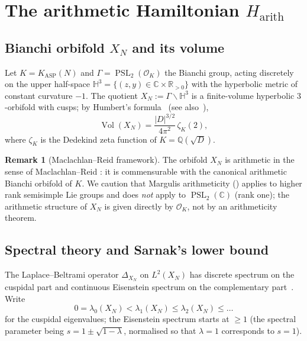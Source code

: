 \documentclass[11pt,a4paper]{article}
\theoremstyle{definition}
\newtheorem{remark}[theorem]{Remark}
\DeclareMathOperator{\Vol}{Vol}
\DeclareMathOperator{\PSL}{PSL}
\newcommand{\KASP}{K_{\mathrm{ASP}}}
\newcommand{\Harith}{H_{\mathrm{arith}}}
\newcommand{\HH}{\mathbb{H}}
\newcommand{\QQ}{\mathbb{Q}}
\newcommand{\RR}{\mathbb{R}}
\newcommand{\CC}{\mathbb{C}}
\newcommand{\OK}{\mathcal{O}_K}
\begin{document}
\section{The arithmetic Hamiltonian $\Harith$}\label{sec:Harith}

\subsection{Bianchi orbifold $X_N$ and its volume}

Let $K = \KASP(N)$ and $\Gamma = \PSL_2(\OK)$ the Bianchi group, acting
discretely on the upper half-space $\HH^3 = \{(z, y) \in \CC\times\RR_{>0}\}$
with the hyperbolic metric of constant curvature $-1$. The quotient
$X_N := \Gamma\backslash\HH^3$ is a finite-volume hyperbolic
$3$-orbifold with cusps; by Humbert's formula~\cite{Humbert1919}
(see also~\cite[\S 9.6]{EGM1998}),
\begin{equation}\label{eq:humbert}
  \Vol(X_N) = \frac{|D|^{3/2}}{4\pi^2}\,\zeta_K(2),
\end{equation}
where $\zeta_K$ is the Dedekind zeta function of $K = \QQ(\sqrt{D})$.

\begin{remark}[Maclachlan--Reid framework]
The orbifold $X_N$ is arithmetic in the sense of Maclachlan--Reid
\cite[Ch.~8]{MaclachlanReid2003}: it is commensurable with the canonical
arithmetic Bianchi orbifold of $K$. We caution that Margulis arithmeticity
(\cite{Margulis1991}) applies to higher rank semisimple Lie groups and
does \emph{not} apply to $\PSL_2(\CC)$ (rank one); the arithmetic structure
of $X_N$ is given directly by $\OK$, not by an arithmeticity theorem.
\end{remark}

\subsection{Spectral theory and Sarnak's lower bound}

The Laplace--Beltrami operator $\Delta_{X_N}$ on $L^2(X_N)$ has discrete
spectrum on the cuspidal part and continuous Eisenstein spectrum on the
complementary part~\cite[Ch.~6]{EGM1998}. Write
\[
  0 = \lambda_0(X_N) < \lambda_1(X_N) \leq \lambda_2(X_N) \leq \dots
\]
for the cuspidal eigenvalues; the Eisenstein spectrum starts at $\geq 1$
(the spectral parameter being $s = 1 \pm \sqrt{1 - \lambda}$, normalised
so that $\lambda = 1$ corresponds to $s = 1$).
\end{document}

